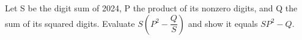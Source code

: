 Let S be the digit sum of 2024, P the product of its nonzero digits, and Q the sum of its squared digits. Evaluate $S(P^2-\dfrac{Q}{S})$ and show it equals $SP^2-Q$.
